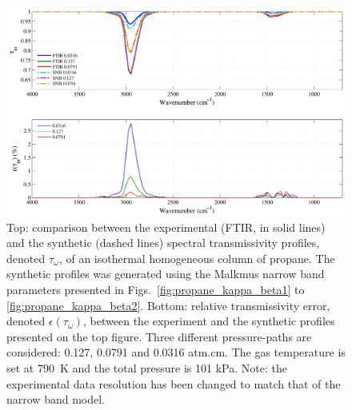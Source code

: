 \begin{figure}[p]
\includegraphics[width=\textwidth]{Figures/Comparison_Fit_Propane_MALKMUS_Temp790K.pdf}
\caption{Top: comparison between the experimental (FTIR, in solid lines) and the synthetic (dashed lines) spectral transmissivity profiles, denoted $\tau_{\omega}$, of an isothermal homogeneous column of propane. The synthetic profiles was generated using the Malkmus narrow band parameters presented in Figs.~\ref{fig:propane_kappa_beta1} to \ref{fig:propane_kappa_beta2}. Bottom: relative transmissivity error, denoted $\epsilon{(\tau_{\omega})}$, between the experiment and the synthetic profiles presented on the top figure. Three different pressure-paths are considered: 0.127, 0.0791 and 0.0316 atm.cm. The gas temperature is set at 790~K and the total pressure is 101 kPa. Note: the experimental data resolution has been changed to match that of the narrow band model. \label{fig:propane_SNBVerify_790K}}
\end{figure}

